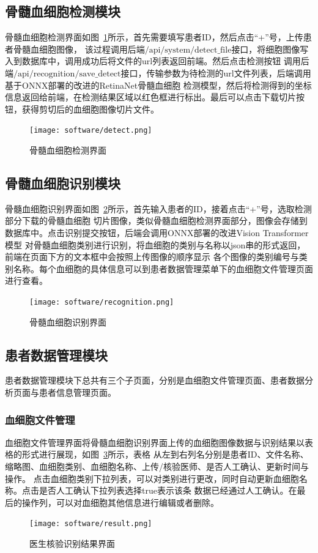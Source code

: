 \subsection{骨髓血细胞检测模块}
骨髓血细胞检测界面如图~\ref{fig:interface_detect}所示，首先需要填写患者ID，然后点击“+”号，上传患者骨髓血细胞图像，
该过程调用后端$\text{/api/system/detect\_file}$接口，将细胞图像写入到数据库中，调用成功后将文件的url列表返回前端。然后点击检测按钮
调用后端$\text{/api/recognition/save\_detect}$接口，传输参数为待检测的url文件列表，后端调用基于ONNX部署的改进的RetinaNet骨髓血细胞
检测模型，然后将检测得到的坐标信息返回给前端，在检测结果区域以红色框进行标出。最后可以点击下载切片按钮，获得剪切后的血细胞图像切片文件。
\begin{figure}[htbp]                     
  \centering                      
  \texttt{[image: software/detect.png]}                      
  \caption{骨髓血细胞检测界面}                      
  \label{fig:interface_detect}       
\end{figure}
\subsection{骨髓血细胞识别模块}
骨髓血细胞识别界面如图~\ref{fig:interface_recog}所示，首先输入患者的ID，接着点击“+”号，选取检测部分下载的骨髓血细胞
切片图像，类似骨髓血细胞检测界面部分，图像会存储到数据库中。点击识别提交按钮，后端会调用ONNX部署的改进Vision Transformer模型
对骨髓血细胞类别进行识别，将血细胞的类别与名称以json串的形式返回，前端在页面下方的文本框中会按照上传图像的顺序显示
各个图像的类别编号与类别名称。每个血细胞的具体信息可以到患者数据管理菜单下的血细胞文件管理页面进行查看。
\begin{figure}[htbp]                     
  \centering                      
  \texttt{[image: software/recognition.png]}                      
  \caption{骨髓血细胞识别界面}                      
  \label{fig:interface_recog}       
\end{figure}
\subsection{患者数据管理模块}
患者数据管理模块下总共有三个子页面，分别是血细胞文件管理页面、患者数据分析页面与患者信息管理页面。
\subsubsection{血细胞文件管理}
血细胞文件管理界面将骨髓血细胞识别界面上传的血细胞图像数据与识别结果以表格的形式进行展现，如图~\ref{fig:interface_result}所示，表格
从左到右列名分别是患者ID、文件名称、缩略图、血细胞类别、血细胞名称、上传/核验医师、是否人工确认、更新时间与操作。
点击血细胞类别下拉列表，可以对类别进行更改，同时自动更新血细胞名称。点击是否人工确认下拉列表选择true表示该条
数据已经通过人工确认。在最后的操作列，可以对血细胞其他信息进行编辑或者删除。
\begin{figure}[htbp]                     
  \centering                      
  \texttt{[image: software/result.png]}                      
  \caption{医生核验识别结果界面}                      
  \label{fig:interface_result}       
\end{figure}
